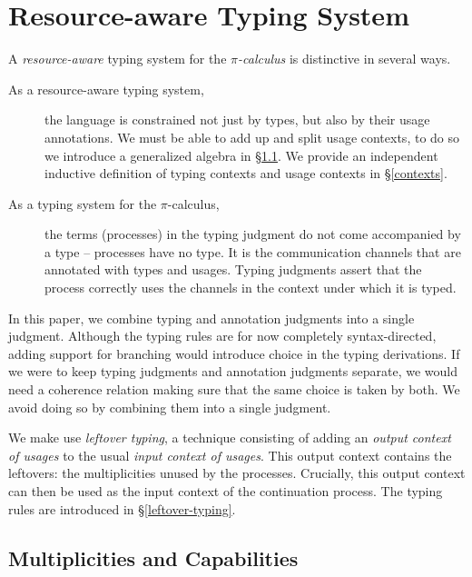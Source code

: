 \documentclass[a4paper,UKenglish,cleveref, autoref, thm-restate,authorcolumns]{lipics-v2019}
\theoremstyle{definition}
\newcommand{\picalc}{$\pi$-calculus}
\begin{document}
\section{Resource-aware Typing System}
\label{type-system}


A \emph{resource-aware} typing system for the \emph{\picalc{}} is distinctive in several ways.

\begin{description}
  \item [As a resource-aware typing system,] the language is constrained not just by types, but also by their usage annotations.
    We must be able to add up and split usage contexts, to do so we introduce a generalized algebra in \S \ref{multiplicities}.
    We provide an independent inductive definition of typing contexts and usage contexts in \S \ref{contexts}.

  \item [As a typing system for the \picalc{},] the terms (processes) in the typing judgment do not come accompanied by a type -- processes have no type.
    It is the communication channels that are annotated with types and usages.
    Typing judgments assert that the process correctly uses the channels in the context under which it is typed.
\end{description}

In this paper, we combine typing and annotation judgments into a single judgment.
Although the typing rules are for now completely syntax-directed, adding support for branching would introduce choice in the typing derivations.
If we were to keep typing judgments and annotation judgments separate, we would need a coherence relation making sure that the same choice is taken by both.
We avoid doing so by combining them into a single judgment.

We make use \emph{leftover typing}, a technique consisting of adding an \emph{output context of usages} to the usual \emph{input context of usages}.
This output context contains the leftovers: the multiplicities unused by the processes.
Crucially, this output context can then be used as the input context of the continuation process.
The typing rules are introduced in \S \ref{leftover-typing}.

\subsection{Multiplicities and Capabilities}
\label{multiplicities}
\end{document}
